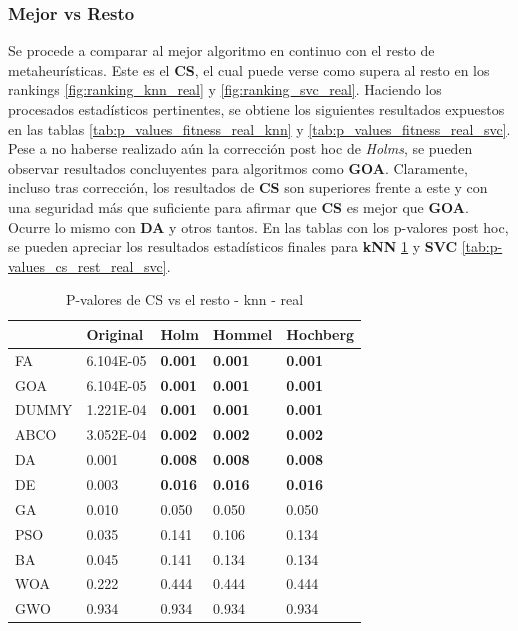\subsubsection{Mejor vs Resto}
Se procede a comparar al mejor algoritmo en continuo con el resto de metaheurísticas. Este es el \textbf{CS}, el cual puede verse como supera al resto en los rankings \ref{fig:ranking_knn_real} y \ref{fig:ranking_svc_real}. Haciendo los procesados estadísticos pertinentes, se obtiene los siguientes resultados expuestos en las tablas \ref{tab:p_values_fitness_real_knn} y \ref{tab:p_values_fitness_real_svc}.\\[6pt]
Pese a no haberse realizado aún la corrección post hoc de \textit{Holms}, se pueden observar resultados concluyentes para algoritmos como \textbf{GOA}. Claramente, incluso tras corrección, los resultados de \textbf{CS} son superiores frente a este y con una seguridad más que suficiente para afirmar que \textbf{CS} es mejor que \textbf{GOA}. Ocurre lo mismo con \textbf{DA} y otros tantos. En las tablas con los p-valores post hoc, se pueden apreciar los resultados estadísticos finales para \textbf{kNN} \ref{tab:p-values_cs_rest_real_knn} y \textbf{SVC} \ref{tab:p-values_cs_rest_real_svc}.

\begin{table}
    \centering
    \begin{tabular}{lllll}
        \toprule
        {}    & Original  & Holm           & Hommel         & Hochberg       \\
        \midrule
        FA    & 6.104E-05 & \textbf{0.001} & \textbf{0.001} & \textbf{0.001} \\
        GOA   & 6.104E-05 & \textbf{0.001} & \textbf{0.001} & \textbf{0.001} \\
        DUMMY & 1.221E-04 & \textbf{0.001} & \textbf{0.001} & \textbf{0.001} \\
        ABCO  & 3.052E-04 & \textbf{0.002} & \textbf{0.002} & \textbf{0.002} \\
        DA    & 0.001     & \textbf{0.008} & \textbf{0.008} & \textbf{0.008} \\
        DE    & 0.003     & \textbf{0.016} & \textbf{0.016} & \textbf{0.016} \\
        GA    & 0.010     & 0.050          & 0.050          & 0.050          \\
        PSO   & 0.035     & 0.141          & 0.106          & 0.134          \\
        BA    & 0.045     & 0.141          & 0.134          & 0.134          \\
        WOA   & 0.222     & 0.444          & 0.444          & 0.444          \\
        GWO   & 0.934     & 0.934          & 0.934          & 0.934          \\
        \bottomrule
    \end{tabular}
    \caption{P-valores de CS vs el resto - knn - real}
    \label{tab:p-values_cs_rest_real_knn}
\end{table}

